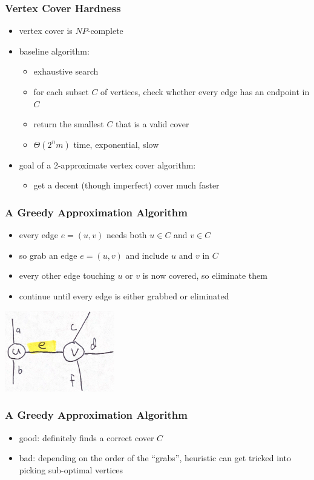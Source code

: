 \documentclass{beamer}
\begin{document}
\begin{frame} \frametitle{Vertex Cover Hardness}
  \begin{itemize}
    \item vertex cover is $NP$-complete
    \item baseline algorithm:
    \begin{itemize}
      \item exhaustive search
      \item for each subset $C$ of vertices, check whether every edge has an
        endpoint in $C$
      \item return the smallest $C$ that is a valid cover
      \item $\Theta(2^n m)$ time, exponential, slow
    \end{itemize}
    \item goal of a 2-approximate vertex cover algorithm:
    \begin{itemize}
      \item get a decent (though imperfect) cover much faster
    \end{itemize}
  \end{itemize}
\end{frame}

\begin{frame} \frametitle{A Greedy Approximation Algorithm}
\begin{itemize}
  \item every edge $e=(u,v)$ needs both $u \in C$ and $v \in C$
  \item so grab an edge $e=(u,v)$ and include $u$ and $v$ in $C$
  \item every other edge touching $u$ or $v$ is now covered, so eliminate them
  \item continue until every edge is either grabbed or eliminated
\end{itemize}
\begin{center}
  \includegraphics[height=100pt]{vertex-cover-greedy.png}
\end{center}
\end{frame}

\begin{frame} \frametitle{A Greedy Approximation Algorithm}
\begin{itemize}
    \item good: definitely finds a correct cover $C$
    \item bad: depending on the order of the ``grabs'', heuristic can get tricked
    into picking sub-optimal vertices
\end{itemize}
\end{frame}
\end{document}
